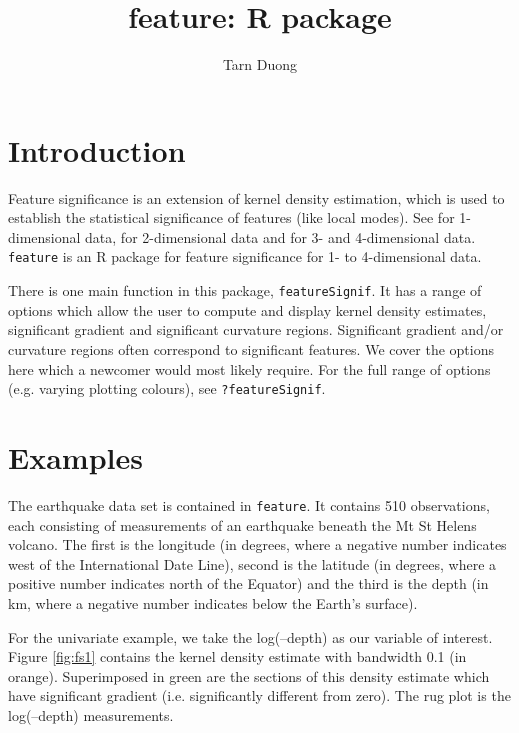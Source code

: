 \documentclass[a4paper]{article}
\title{feature: R package}
\author{Tarn Duong}
\begin{document}
\maketitle

\section{Introduction}

Feature significance is an extension of kernel density estimation, 
which is used to establish the statistical significance of 
features (like local modes). See  for 1-dimensional data,
 for  2-dimensional data and 
for 3- and 4-dimensional data. \texttt{feature} is an R package for 
feature significance for 1- to 4-dimensional data.
  
There is one main function in this package, \texttt{featureSignif}. 
It has a range of options which allow
the user to compute and display kernel density estimates, significant gradient
and significant curvature regions. Significant gradient and/or
curvature regions often correspond to significant features. 
We cover the options here which a newcomer would most likely require. 
For the full range of options (e.g. varying
plotting colours), see \texttt{?featureSignif}.


\section{Examples}
The earthquake data set is contained in 
\texttt{feature}. It contains 510 observations, each consisting
of measurements of an earthquake beneath the Mt St Helens volcano.
The first is the longitude (in degrees, where a negative number
indicates west of the International Date Line), second  is
the latitude (in degrees, where a positive number indicates north of
the Equator) and the third  is the depth (in km, where a
negative number indicates below the Earth's surface).

For the univariate example, we take the log(--depth)
as our variable of interest. 
Figure \ref{fig:fs1} contains the kernel
density estimate with bandwidth 0.1 (in orange). Superimposed in green 
are the sections of this density estimate which have significant gradient
(i.e. significantly different from zero). The rug plot is 
the log(--depth) measurements.
\end{document}
